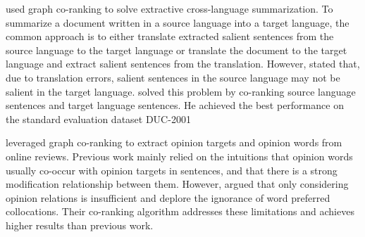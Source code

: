      used graph co-ranking to solve
    extractive cross-language summarization. To summarize a document written in
    a source language into a target language, the common approach is to either
    translate extracted salient sentences from the source language to the target
    language or translate the document to the target language and extract
    salient sentences from the translation. However,
     stated that, due to translation
    errors, salient sentences in the source language may not be salient in the
    target language.  solved this problem
    by co-ranking source language sentences and target language sentences. He
    achieved the best performance on the standard evaluation dataset
    DUC-2001~\cite{over2001duc}

     leveraged graph co-ranking to
    extract opinion targets and opinion words from online reviews. Previous work
    mainly relied on the intuitions that opinion words usually co-occur with
    opinion targets in sentences, and that there is a strong modification
    relationship between them. However, 
    argued that only considering opinion relations is insufficient and deplore
    the ignorance of word preferred collocations. Their co-ranking algorithm
    addresses these limitations and achieves higher results than previous work.


